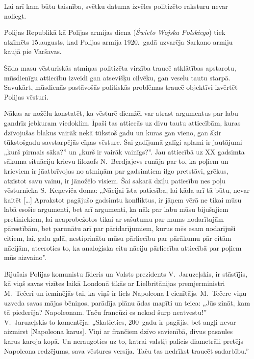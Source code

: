 \documentclass[twoside,a5paper,12pt,fleqn,openany]{extbook}
\newcommand{\pltxti}[1]{\textit{\textpolish{#1}}}
\newcommand{\citespace}{[\dots{}]}
\begin{document}
Lai arī kam būtu taisnība, svētku datuma izvēles politizēto raksturu nevar noliegt.

Polijas Republikā kā Polijas armijas diena (\pltxti{Świeto Wojska Polskiego}) tiek atzīmēts 15.augusts, kad Polijas armija 1920.~gadā uzvarēja Sarkano armiju kaujā pie Varšavas.

Šāda masu vēsturiskās atmiņas politizēta virzība traucē atklātības apstarotu, mūsdienīgu attiecību izveidi gan atsevišķu cilvēku, gan veselu tautu starpā. Savukārt, mūsdienās pastāvošās politiskās problēmas traucē objektīvi izvērtēt Polijas vēsturi.

Nākas ar nožēlu konstatēt, ka vēsturē diemžēl var atrast argumentus par labu gandrīz jebkuram viedoklim. Īpaši tas attiecās uz divu tautu attiecībām, kuras dzīvojušas blakus vairāk nekā tūkstoš gadu un kuras gan vieno, gan šķir tūkstošgadu savstarpējās cīņas vēsture. Šai gadījumā galīgi aplami ir jautājumi „kurš pirmais sāka?” un „kurš ir vairāk vainīgs?”. Jau attiecībā uz XX gadsimta sākuma situāciju krievu filozofs N.~Berdjajevs runāja par to, ka poļiem un krieviem ir jāatbrīvojas no atmiņām par gadsimtiem ilgo pretstāvi, grēkus, atzīstot savu vainu, ir jānožēlo visiem. Šai sakarā dziļu patiesību nes poļu vēsturnieka S.~Keņeviča doma: „Nācijai īsta patiesība, lai kāda arī tā būtu, nevar kaitēt \citespace{} Aprakstot pagājušo gadsimtu konfliktus, ir jāņem vērā ne tikai mūsu labā esošie argumenti, bet arī argumenti, ka nāk par labu mūsu bijušajiem pretiniekiem, lai neaprobežotos tikai ar sašutumu par mums nodarītajām pārestībām, bet parunātu arī par pāridarījumiem, kurus mēs esam nodarījuši citiem, lai, galu galā, nestiprinātu mūsu pārliecību par pārākumu pār citām nācijām, atceroties to, ka analoģiska citu nāciju pārliecība attiecībā par poļiem mūs aizvaino”.

Bijušais Polijas komunistu līderis un Valsts prezidents V.~Jaruzeļskis, ir stāstījis, kā viņš savas vizītes laikā Londonā tikās ar Lielbritānijas premjerministri M.~Tečeri un ieminējās tai, ka viņš ir liels Napoleona I cienītājs. M.~Tečere viņu uzveda savas mājas bēniņos, parādīja plānu ādas mapīti un teica: „Jūs zināt, kam tā piederēja? Napoleonam. Taču francūzi es nekad šurp neatvestu!” V.~Jaruzeļskis to komentēja: „Skatieties, 200~gadu ir pagājis, bet angļi nevar aizmirst [Napoleona karus]. Viņi ar frančiem dzīvo savienībā, divus pasaules karus karoja kopā. Un neraugoties uz to, katrai valstij palicis diametrāli pretējs Napoleona redzējums, sava vēstures versija. Taču tas nedrīkst traucēt sadarbību.”
\end{document}
